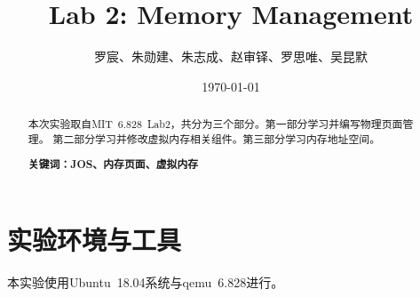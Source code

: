\documentclass[12pt,a4paper,UTF8]{article}
\begin{document}
\title{Lab 2: Memory Management}
\author{罗宸、朱勋建、朱志成、赵审铎、罗思唯、吴昆默}
\date{\today}

\maketitle

\begin{abstract}
    \setlength{\parindent}{2em}
    本次实验取自MIT\ 6.828\ Lab2，共分为三个部分。第一部分学习并编写物理页面管理。
    第二部分学习并修改虚拟内存相关组件。第三部分学习内存地址空间。

    \textbf{关键词：JOS、内存页面、虚拟内存}
\end{abstract}




\section{实验环境与工具}

本实验使用Ubuntu\ 18.04系统与qemu\ 6.828进行。




\end{document}
